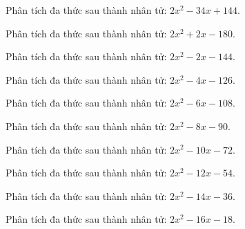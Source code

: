 \begin{bt}
	Phân tích đa thức sau thành nhân tử: $2 x^2 - 34 x + 144$.
\end{bt}
\begin{bt}
	Phân tích đa thức sau thành nhân tử: $2 x^2 + 2 x - 180$.
\end{bt}
\begin{bt}
	Phân tích đa thức sau thành nhân tử: $2 x^2 - 2 x - 144$.
\end{bt}
\begin{bt}
	Phân tích đa thức sau thành nhân tử: $2 x^2 - 4 x - 126$.
\end{bt}
\begin{bt}
	Phân tích đa thức sau thành nhân tử: $2 x^2 - 6 x - 108$.
\end{bt}
\begin{bt}
	Phân tích đa thức sau thành nhân tử: $2 x^2 - 8 x - 90$.
\end{bt}
\begin{bt}
	Phân tích đa thức sau thành nhân tử: $2 x^2 - 10 x - 72$.
\end{bt}
\begin{bt}
	Phân tích đa thức sau thành nhân tử: $2 x^2 - 12 x - 54$.
\end{bt}
\begin{bt}
	Phân tích đa thức sau thành nhân tử: $2 x^2 - 14 x - 36$.
\end{bt}
\begin{bt}
	Phân tích đa thức sau thành nhân tử: $2 x^2 - 16 x - 18$.
\end{bt}
